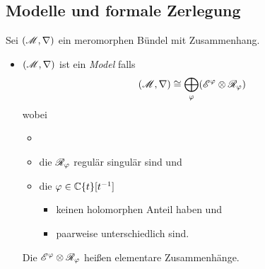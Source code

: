 \TODO[\cite{sabbah2007isomonodromic}: Def II.2.24]
\subsection{Modelle und formale Zerlegung}%
\begin{comment}
  Durch das Tensorieren mit formalen Potenzreihen erhält man einen Funktor.
\end{comment}
\begin{defn}
  Sei $(\mathscr{M},\nabla)$ ein meromorphen Bündel mit Zusammenhang.
  \begin{itemize}
    \item $(\mathscr{M},\nabla)$ ist ein \emph{Model} falls
      \[
        (\mathscr{M},\nabla)
        \cong
        \bigoplus_\varphi(\mathscr{E}^\varphi\otimes\mathscr{R}_\varphi)
      \]
      wobei
      \begin{itemize}
        \item {}
        \item die $\mathscr{R}_\varphi$ regulär singulär sind und
        \item die
          $\varphi\in\mathbb{C}\{t\}[t^{-1}]$
          \begin{itemize}
            \item keinen holomorphen Anteil haben und
            \item paarweise unterschiedlich sind.
          \end{itemize}
      \end{itemize}
      Die $\mathscr{E}^\varphi\otimes\mathscr{R}_\varphi$ heißen elementare Zusammenhänge.
  \end{itemize}
\end{defn}
\begin{comment}
  \begin{thm}[Levelt-Turittin]
    Zu einem formalem meromorphen Zusammenhang gibt es, bis auf Zurückziehen,
    immer einen Isomorphismus zu einer direkten Summe formaler elementarer
    Zusammenhänge.
    \begin{rem}
      \textbf{Übergang:}
      Aber keinen konvergenten lift.
      Sektorweise aber schon mit asymptotischer Analysis
    \end{rem}
  \end{thm}
\end{comment}
